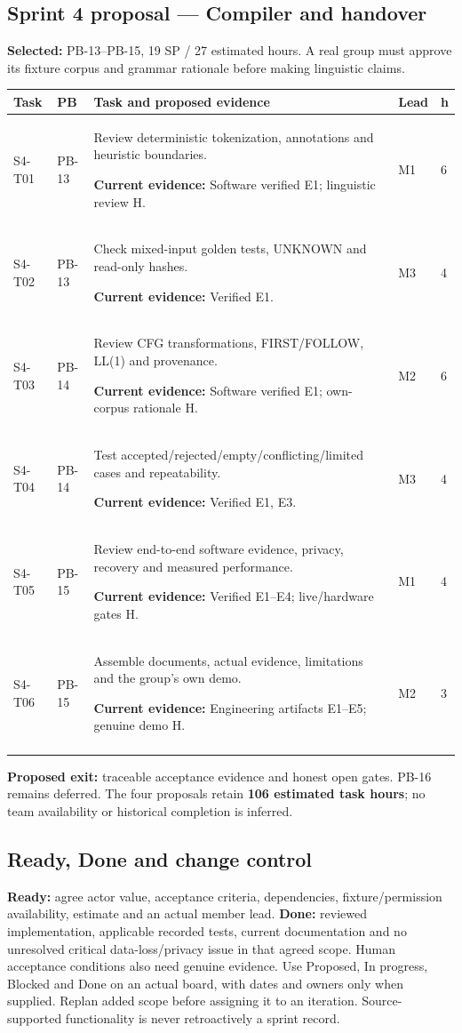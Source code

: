 \documentclass[11pt,a4paper]{article}
\newcommand{\sprinttask}[6]{#1 & #2 & #3\par\smallskip\textbf{Current evidence:} #6 & #4 & #5\\\addlinespace}
\begin{document}
\subsection{Sprint 4 proposal --- Compiler and handover}
\textbf{Selected:} PB-13--PB-15, 19 SP / 27 estimated hours. A real group must
approve its fixture corpus and grammar rationale before making linguistic claims.
\begingroup\small
\begin{longtable}{L{1.3cm}L{1.2cm}L{8.2cm}L{1.1cm}L{0.8cm}}
\toprule\textbf{Task} & \textbf{PB} & \textbf{Task and proposed evidence} & \textbf{Lead} & \textbf{h}\\\midrule\endhead
\sprinttask{S4-T01}{PB-13}{Review deterministic tokenization, annotations and heuristic boundaries.}{M1}{6}{Software verified E1; linguistic review H.}
\sprinttask{S4-T02}{PB-13}{Check mixed-input golden tests, UNKNOWN and read-only hashes.}{M3}{4}{Verified E1.}
\sprinttask{S4-T03}{PB-14}{Review CFG transformations, FIRST/FOLLOW, LL(1) and provenance.}{M2}{6}{Software verified E1; own-corpus rationale H.}
\sprinttask{S4-T04}{PB-14}{Test accepted/rejected/empty/conflicting/limited cases and repeatability.}{M3}{4}{Verified E1, E3.}
\sprinttask{S4-T05}{PB-15}{Review end-to-end software evidence, privacy, recovery and measured performance.}{M1}{4}{Verified E1--E4; live/hardware gates H.}
\sprinttask{S4-T06}{PB-15}{Assemble documents, actual evidence, limitations and the group's own demo.}{M2}{3}{Engineering artifacts E1--E5; genuine demo H.}
\bottomrule\end{longtable}\endgroup
\textbf{Proposed exit:} traceable acceptance evidence and honest open gates.
PB-16 remains deferred. The four proposals retain \textbf{106 estimated
task hours}; no team availability or historical completion is inferred.

\subsection{Ready, Done and change control}
\textbf{Ready:} agree actor value, acceptance criteria, dependencies,
fixture/permission availability, estimate and an actual member lead.
\textbf{Done:} reviewed implementation, applicable recorded tests,
current documentation and no unresolved critical data-loss/privacy issue
in that agreed scope. Human acceptance conditions also need genuine evidence.
Use Proposed, In progress, Blocked and Done on an actual board, with dates and
owners only when supplied. Replan added scope before assigning it to an
iteration. Source-supported functionality is never retroactively a sprint record.
\end{document}
